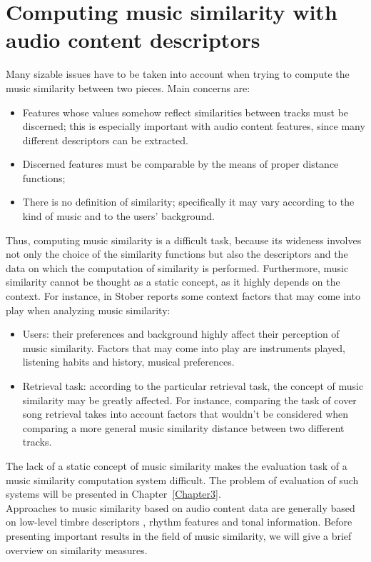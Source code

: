 \section{Computing music similarity with audio content descriptors}
\label{sec:audiocontentsimilarity}
Many sizable issues have to be taken into account when trying to compute the music similarity between two pieces. Main concerns are:
\begin{itemize}
\item Features whose values somehow reflect similarities between tracks must be discerned; this is especially important with audio content features, since many different descriptors can be extracted.
\item Discerned features must be comparable by the means of proper distance functions;
\item There is no definition of similarity; specifically it may vary according to the kind of music and to the users' background.
\end{itemize}

Thus, computing music similarity is a difficult task, because its wideness involves not only the choice of the similarity functions but also the descriptors and the data on which the computation of similarity is performed. 
Furthermore, music similarity cannot be thought as a static concept, as it highly depends on the context. For instance, in \cite{stober11} Stober reports some context factors that may come into play when analyzing music similarity:
\begin{itemize}
\item Users: their preferences and background highly affect their perception of music similarity. Factors that may come into play are instruments played, listening habits and history, musical preferences.
\item Retrieval task: according to the particular retrieval task, the concept of music similarity may be greatly affected. For instance, comparing the task of cover song retrieval takes into account factors that wouldn't be considered when comparing a more general music similarity distance between two different tracks.
\end{itemize}

The lack of a static concept of music similarity makes the evaluation task of a music similarity computation system difficult. The problem of evaluation of such systems will be presented in Chapter~\ref{Chapter3}.  \\

Approaches to music similarity based on audio content data are generally based on low-level timbre descriptors \cite{aucou04}, rhythm features and tonal information. 
Before presenting important results in the field of music similarity, we will give a brief overview on similarity measures. 
